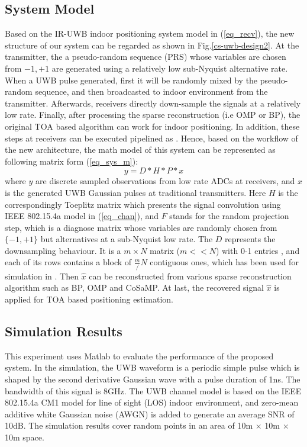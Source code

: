 \subsection{System Model}

Based on the IR-UWB indoor positioning system model in (\ref{eq_recv}), the new structure of our system can be regarded as shown in Fig.\ref{cs-uwb-design2}. At the transmitter, the a pseudo-random sequence (PRS) whose variables are chosen from ${-1,+1}$ are generated using a relatively low sub-Nyquist alternative rate. When a UWB pulse generated, first it will be randomly mixed by the pseudo-random sequence, and then broadcasted to indoor environment from the transmitter. Afterwards, receivers directly down-sample the signals at a relatively low rate. Finally, after processing the sparse reconstruction (i.e OMP or BP), the original TOA based algorithm can work for indoor positioning. In addition, these steps at receivers can be executed pipelined as \cite{yang2011compressive}. Hence, based on the workflow of the new architecture, the math model of this system can be represented as following matrix form (\ref{eq_sys_m}):
\begin{equation}
\label{eq_sys_m}
y = D * H * P * x
\end{equation}
where $y$ are discrete sampled observations from low rate ADCs at receivers, and $x$ is the generated UWB Gaussian pulses at traditional transmitters. Here $H$ is the correspondingly Toeplitz matrix which presents the signal convolution using IEEE 802.15.4a model in (\ref{eq_chan}), and $F$ stands for the random projection step, which is a diagnose matrix whose variables are randomly chosen from $\{-1,+1\}$ but alternatives at a sub-Nyquist low rate. The $D$ represents the downsampling behaviour. It is a $m\times N$ matrix ($m << N$) with 0-1 entries , and each of its rows contains a block of $\frac{m}/{N}$ contiguous ones, which has been used for simulation in \cite{tropp2010beyond}. Then $\hat x$ can be reconstructed from various sparse reconstruction algorithm such as BP, OMP and CoSaMP. At last, the recovered signal $\hat x$ is applied for TOA based positioning estimation.

\subsection{Simulation Results}

\indent \indent This experiment uses Matlab to evaluate the performance of the proposed system. In the simulation, the UWB waveform is a periodic simple pulse which is shaped by the second derivative Gaussian wave with a pulse duration of 1ns. The bandwidth of this signal is 8GHz. The UWB channel model is based on the IEEE 802.15.4a CM1 model for line of sight (LOS) indoor environment, and zero-mean additive white Gaussian noise (AWGN) is added to generate an average SNR of 10dB. The simulation results cover random points in an area of 10m $\times$ 10m $\times$ 10m space.

